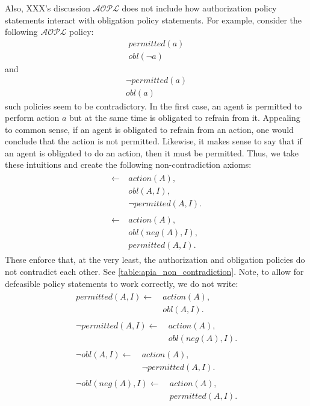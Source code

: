 Also, XXX's discussion $\mathcal{AOPL}$ does not include how authorization policy statements interact with obligation policy statements.
For example, consider the following $\mathcal{AOPL}$ policy:
\begin{gather}
    permitted(a) \\
    obl(\neg a)
\end{gather}
and
\begin{gather}
    \neg permitted(a) \\
    obl(a)
\end{gather}
such policies seem to be contradictory.
In the first case, an agent is permitted to perform action $a$ but at the same time is obligated to refrain from it.
Appealing to common sense, if an agent is obligated to refrain from an action, one would conclude that the action is not permitted.
Likewise, it makes sense to say that if an agent is obligated to do an action, then it must be permitted.
Thus, we take these intuitions and create the following non-contradiction axioms:
\begin{gather}
    \begin{split}
        \leftarrow \
            & action(A), \\
            & obl(A, I), \\
            & \neg permitted(A, I).
    \end{split} \\
    \begin{split}
        \leftarrow \
            & action(A), \\
            & obl(neg(A), I), \\
            & permitted(A, I).
    \end{split}
\end{gather}
These enforce that, at the very least, the authorization and obligation policies do not contradict each other.
See \cref{table:apia_non_contradiction}.
Note, to allow for defeasible policy statements to work correctly, we do not write:
\begin{gather}
    \begin{split}
        permitted(A, I) \leftarrow \
            & action(A), \\
            & obl(A, I).
    \end{split} \\
    \begin{split}
        \neg permitted(A, I) \leftarrow \
            & action(A), \\
            & obl(neg(A), I).
    \end{split} \\
    \begin{split}
        \neg obl(A, I) \leftarrow \
            & action(A), \\
            & \neg permitted(A, I).
    \end{split} \\
    \begin{split}
        \neg obl(neg(A), I) \leftarrow \
            & action(A), \\
            & permitted(A, I).
    \end{split}
\end{gather}

